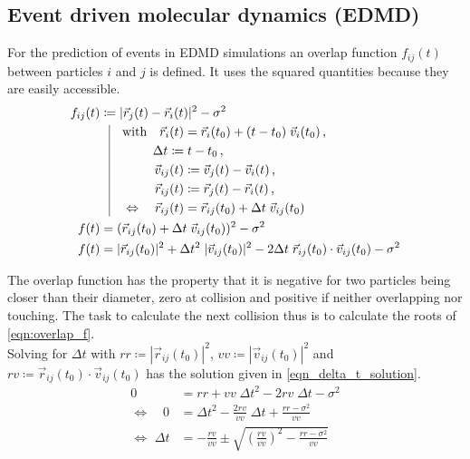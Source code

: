 \subsection{Event driven molecular dynamics (EDMD)}
\label{sec:EDMD}
For the prediction of events in EDMD simulations an overlap function $f_{ij}(t)$ between particles $i$ and $j$ is defined. It uses the squared quantities because they are easily accessible.\\
\begin{align}
f_{ij}(t) & \coloneqq  | \vec{r}_j(t) - \vec{r}_i(t) |^2 - \sigma^2\\
          & \; \; \, \vrule
  \begin{aligned}[t]
    \quad \text{with} \quad \vec{r}_i(t) &= \vec{r}_i(t_0) + (t-t_0) \; \vec{v}_i(t_0) \, \text{,}\\
    \Delta t \coloneqq & \; t-t_0  \, \text{,} \\ 
    \vec{v}_{ij}(t) &\coloneqq  \vec{v}_j(t) - \vec{v}_i(t) \, \text{,}\\
    \vec{r}_{ij}(t) &\coloneqq  \vec{r}_j(t) - \vec{r}_i(t) \, \text{,}\\
    \Leftrightarrow \quad \vec{r}_{ij}(t) &= \vec{r}_{ij}(t_0) + \Delta t \; \vec{v}_{ij}(t_0)
  \end{aligned}\\
f(t)  & = ( \vec{r}_{ij}(t_0) +  \Delta t \;  \vec{v}_{ij}(t_0))^2 -\sigma^2 \\
\label{eqn:overlap_f}
f(t)  & = |\vec{r}_{ij}(t_0)|^2 + \Delta t ^2 \; |\vec{v}_{ij}(t_0)|^2 - 2 \Delta t \; \vec{r}_{ij}(t_0) \cdot \vec{v}_{ij}(t_0)  -\sigma^2
\end{align}  

The overlap function has the property that it is negative for two particles being closer than their diameter, zero at collision and positive if neither overlapping nor touching. The task to calculate the next collision thus is to calculate the roots of \autoref{eqn:overlap_f}.\\

Solving for $\Delta t$ with $rr \coloneqq |\vec{r}_{ij}(t_0)|^2  $, $vv \coloneqq |\vec{v}_{ij}(t_0)|^2  $ and  $ rv \coloneqq \vec{r}_{ij}(t_0) \cdot \vec{v}_{ij}(t_0) $ has the solution given in \autoref{eqn_delta_t_solution}.
\begin{align}
0 &= rr + vv \; \Delta t ^2  - 2 rv \; \Delta t  -\sigma^2 \nonumber\\
\Leftrightarrow \quad 0 &= \Delta t ^2 - \frac{2rv}{vv} \; \Delta t + \frac{rr - \sigma^2 }{vv} \nonumber\\
\label{eqn_delta_t_solution}
\Leftrightarrow \, \, \Delta t &= - \frac{rv}{vv} \pm \sqrt{\left(\frac{rv}{vv}\right)^2 - \frac{rr - \sigma^2 }{vv}}
\end{align}

